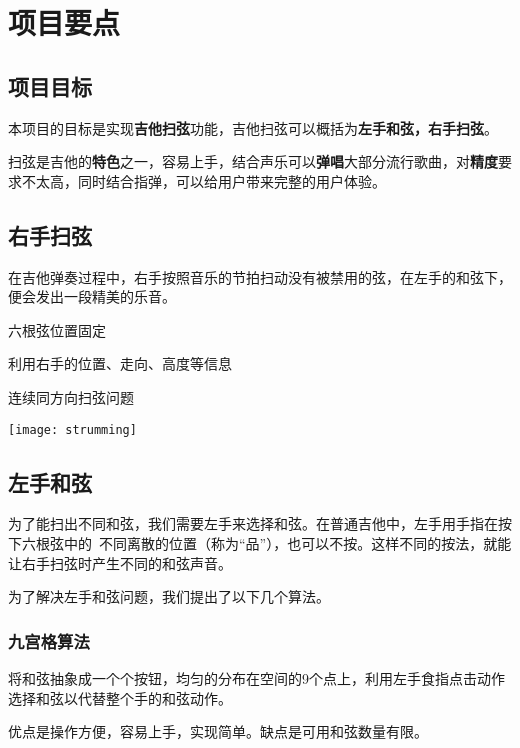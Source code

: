 \chapter{项目要点}

    \section{项目目标}

        本项目的目标是实现\textbf{吉他扫弦}功能，吉他扫弦可以概括为\textbf{左手和弦，右手扫弦}。

        扫弦是吉他的\textbf{特色}之一，容易上手，结合声乐可以\textbf{弹唱}大部分流行歌曲，对\textbf{精度}要求不太高，同时结合指弹，可以给用户带来完整的用户体验。
        
    \section{右手扫弦}

        在吉他弹奏过程中，右手按照音乐的节拍扫动没有被禁用的弦，在左手的和弦下，便会发出一段精美的乐音。


        六根弦位置固定

        利用右手的位置、走向、高度等信息

        连续同方向扫弦问题

        \texttt{[image: strumming]}

    \section{左手和弦}

        为了能扫出不同和弦，我们需要左手来选择和弦。在普通吉他中，左手用手指在按下六根弦中的\
        不同离散的位置（称为“品”），也可以不按。这样不同的按法，就能让右手扫弦时产生不同的和弦声音。


        为了解决左手和弦问题，我们提出了以下几个算法。

        \subsection{九宫格算法}

        将和弦抽象成一个个按钮，均匀的分布在空间的9个点上，利用左手食指点击动作选择和弦以代替整个手的和弦动作。

        优点是操作方便，容易上手，实现简单。缺点是可用和弦数量有限。

